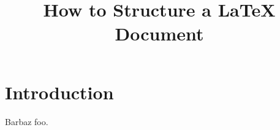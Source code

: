 \documentclass{article}
\begin{document}
\title{How to Structure a \LaTeX{} Document} %
\maketitle

\section{Introduction}
Barbaz foo.
\end{document}
